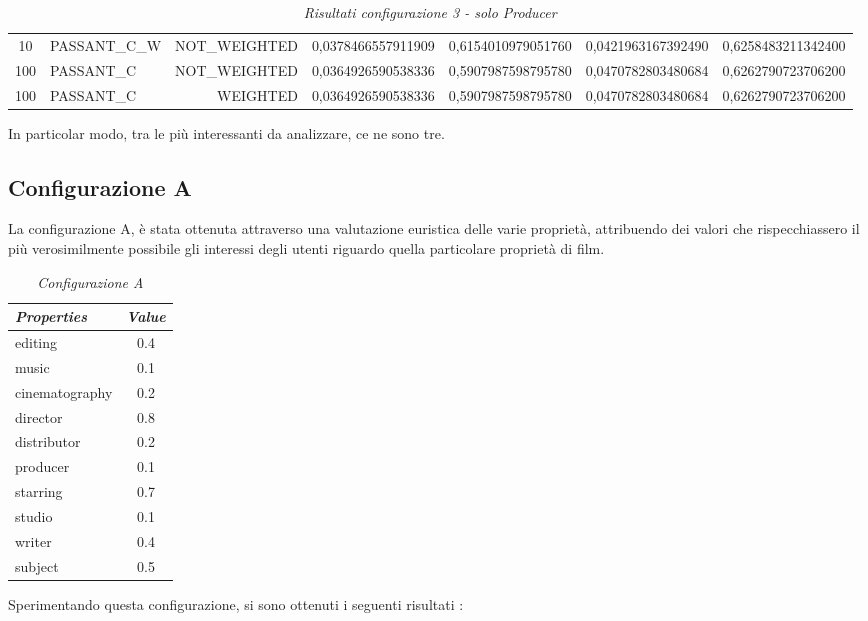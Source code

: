 \begin{table}[H]
{\begin{tabular}{ c l r c c c c }
				10 & PASSANT\_C\_W & NOT\_WEIGHTED & 0,0378466557911909 & 0,6154010979051760 & 0,0421963167392490 & 0,6258483211342400 \\
				
				100 &  PASSANT\_C & NOT\_WEIGHTED & 0,0364926590538336 & 0,5907987598795780 & 0,0470782803480684 & 0,6262790723706200 \\
				
				100 &  PASSANT\_C &   WEIGHTED & 0,0364926590538336 & 0,5907987598795780 & 0,0470782803480684 & 0,6262790723706200 \\
			\bottomrule
		\end{tabular}  
		}
	\caption{\emph{Risultati configurazione 3 - solo Producer}}
\end{table} 

In particolar modo, tra le più interessanti da analizzare, ce ne sono tre.
\subsection{Configurazione A}
La configurazione A, è stata ottenuta attraverso una valutazione euristica delle varie proprietà, attribuendo dei valori che rispecchiassero il più verosimilmente possibile gli interessi degli utenti riguardo quella particolare proprietà di film.
\begin{table}[H]
\small
\centering
\begin{tabular}{l c}
\textit{Properties} & \textit{Value} \\\hline
editing & 0.4 \\
music & 0.1 \\
cinematography & 0.2 \\
director & 0.8 \\
distributor & 0.2 \\
producer & 0.1 \\
starring & 0.7 \\
studio & 0.1 \\
writer & 0.4 \\
subject & 0.5 \\
\end{tabular}
\caption{\emph{Configurazione A}}
\end{table}
Sperimentando questa configurazione, si sono ottenuti i seguenti risultati : 


\setlength{\tabcolsep}{12pt}

